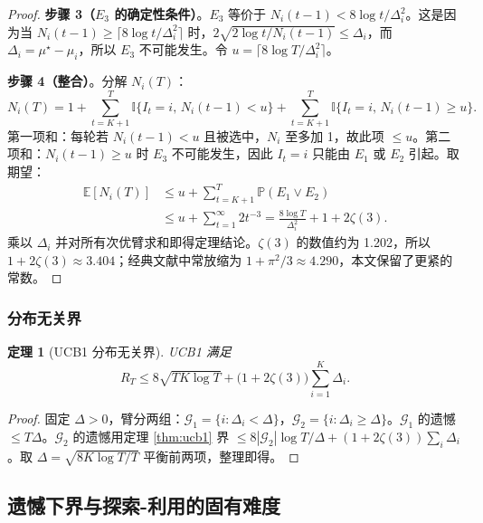 \documentclass[UTF8,a4paper,11pt,zihao=5]{ctexart}
\newtheorem{theorem}{定理}[section]
\newcommand{\E}{\mathbb{E}}
\newcommand{\Pbb}{\mathbb{P}}
\newcommand{\ind}{\mathbb{I}}
\newcommand{\regret}[1]{R_{#1}}
\begin{document}
\begin{proof}
\textbf{步骤 3（$E_3$ 的确定性条件）}。$E_3$ 等价于 $N_i(t-1) < 8 \log t / \Delta_i^{2}$。这是因为当 $N_i(t-1) \ge \lceil 8 \log t / \Delta_i^2 \rceil$ 时，$2\sqrt{2 \log t / N_i(t-1)} \le \Delta_i$，而 $\Delta_i = \mu^\star - \mu_i$，所以 $E_3$ 不可能发生。令 $u = \lceil 8 \log T / \Delta_i^{2} \rceil$。

\textbf{步骤 4（整合）}。分解 $N_i(T)$：
\begin{equation}\label{eq:nidecomp}
    N_i(T) = 1 + \!\!\sum_{t=K+1}^{T}\!\! \ind\{I_t = i,\, N_i(t-1) < u\}
            + \!\!\sum_{t=K+1}^{T}\!\! \ind\{I_t = i,\, N_i(t-1) \ge u\}.
\end{equation}
第一项和：每轮若 $N_i(t-1) < u$ 且被选中，$N_i$ 至多加 1，故此项 $\le u$。第二项和：$N_i(t-1) \ge u$ 时 $E_3$ 不可能发生，因此 $I_t = i$ 只能由 $E_1$ 或 $E_2$ 引起。取期望：
\begin{align}
    \E[N_i(T)] &\le u + \sum_{t=K+1}^{T} \Pbb(E_1 \lor E_2) \nonumber\\
               &\le u + \sum_{t=1}^{\infty} 2 t^{-3}
                = \frac{8 \log T}{\Delta_i^{2}} + 1 + 2\zeta(3). \label{eq:nibound}
\end{align}
乘以 $\Delta_i$ 并对所有次优臂求和即得定理结论。$\zeta(3)$ 的数值约为 1.202，所以 $1 + 2\zeta(3) \approx 3.404$；经典文献中常放缩为 $1 + \pi^{2}/3 \approx 4.290$，本文保留了更紧的常数。
\end{proof}

\subsubsection{分布无关界}

\begin{theorem}[UCB1 分布无关界]\label{thm:ucb1_df}
UCB1 满足
\begin{equation}
    \regret{T} \leq 8 \sqrt{T K \log T} + \bigl(1 + 2\zeta(3)\bigr) \sum_{i=1}^{K} \Delta_i.
\end{equation}
\end{theorem}

\begin{proof}
固定 $\Delta > 0$，臂分两组：$\mathcal{G}_1 = \{i: \Delta_i < \Delta\}$，$\mathcal{G}_2 = \{i: \Delta_i \geq \Delta\}$。$\mathcal{G}_1$ 的遗憾 $\le T\Delta$。$\mathcal{G}_2$ 的遗憾用定理 \ref{thm:ucb1} 界 $\le 8|\mathcal{G}_2|\log T / \Delta + (1+2\zeta(3))\sum_i \Delta_i$。取 $\Delta = \sqrt{8 K \log T / T}$ 平衡前两项，整理即得。
\end{proof}

\subsection{遗憾下界与探索-利用的固有难度}
\end{document}
